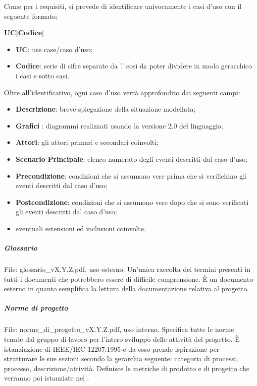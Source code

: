            Come per i requisiti, si prevede di identificare univocamente i casi d'uso con il seguente formato:
            \begin{center}
                \textbf{UC[Codice]}
            \end{center}
            \begin{itemize}
                \item \textbf{UC}: use case/caso d'uso;
                \item \textbf{Codice}: serie di cifre separate da ’.’ così da poter dividere in modo gerarchico i casi e sotto casi.
            \end{itemize}
            Oltre all'identificativo, ogni caso d'uso verrà approfondito dai seguenti campi:
            \begin{itemize}
                \item \textbf{Descrizione}: breve spiegazione della situazione modellata;
                \item \textbf{Grafici }: diagrammi realizzati usando la versione 2.0 del linguaggio;
                \item \textbf{Attori}: gli attori primari e secondari coinvolti;
                \item \textbf{Scenario Principale}: elenco numerato degli eventi descritti dal caso d'uso;
                \item \textbf{Precondizione}: condizioni che si assumono vere prima che si verifichino gli eventi descritti dal caso d'uso;
                \item \textbf{Postcondizione}: condizioni che si assumono vere dopo che si sono verificati gli eventi descritti dal caso d'uso;
                \item eventuali estensioni ed inclusioni coinvolte.
            \end{itemize}

            \subparagraph{Glossario}
            File: glossario\_vX.Y.Z.pdf, uso esterno. Un'unica raccolta dei termini presenti in tutti i documenti che potrebbero essere di difficile comprensione. È un documento esterno in quanto semplifica la lettura della documentazione relativa al progetto.

            \subparagraph{Norme di progetto}
            File: norme\_di\_progetto\_vX.Y.Z.pdf, uso interno. Specifica tutte le norme tenute dal gruppo di lavoro per l'intero sviluppo delle attività del progetto. È istanziazione di IEEE/IEC 12207:1995 e da esso prende ispirazione per strutturare le sue sezioni secondo la gerarchia seguente: categoria di processi, processo, descrizione/attività. Definisce le metriche di prodotto e di progetto che verranno poi istanziate nel .

